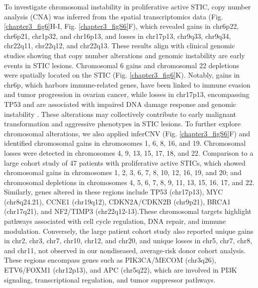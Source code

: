 \begin{refsection}
    To investigate chromosomal instability in proliferative active STIC, copy number analysis (CNA) was inferred from the spatial transcriptomics data (Fig. \ref{chapter3_fig6}H-I, Fig. \ref{chapter3_figS6}F), which revealed gains in chr6p22, chr6p21, chr1p32, and chr16p13, and losses in chr17p13, chr9q33, chr9q34, chr22q11, chr22q12, and chr22q13. These results align with clinical genomic studies showing that copy number alterations and genomic instability are early events in STIC lesions\cite{Wu2019Genomic,Chang2025Integrated,Devlin1996High,Zhakula2024Patterns}. Chromosomal 6 gains and chromosomal 22 depletions were spatially located on the STIC (Fig. \ref{chapter3_fig6}K). Notably, gains in chr6p, which harbors immune-related genes, have been linked to immune evasion and tumor progression in ovarian cancer, while losses in chr17p13, encompassing TP53 and are associated with impaired DNA damage response and genomic instability \cite{Zhakula2024Patterns}. These alterations may collectively contribute to early malignant transformation and aggressive phenotypes in STIC lesions. 
    To further explore chromosomal alterations, we also applied inferCNV (Fig. \ref{chapter3_figS6}F) and identified chromosomal gains in chromosomes 1, 6, 8, 16, and 19. Chromosomal losses were detected in chromosomes 4, 9, 13, 15, 17, 18, and 22.  Comparison to a large cohort study of 47 patients with proliferative active STICs\cite{Chang2025Integrated}, which showed chromosomal gains in chromosomes 1, 2, 3, 6, 7, 8, 10, 12, 16, 19, and 20; and chromosomal depletions in chromosomes 4, 5, 6, 7, 8, 9, 11, 13, 15, 16, 17, and 22. Similarly, genes altered in these regions include TP53 (chr17p13), MYC (chr8q24.21), CCNE1 (chr19q12), CDKN2A/CDKN2B (chr9p21), BRCA1 (chr17q21), and NF2/TIMP3 (chr22q12-13).These chromosomal targets highlight pathways associated with cell cycle regulation, DNA repair, and immune modulation. Conversely, the large patient cohort study also reported unique gains in chr2, chr3, chr7, chr10, chr12, and chr20, and unique losses in chr5, chr7, chr8, and chr11, not observed in our nondiseased, average-risk donor cohort analysis. These regions encompass genes such as PIK3CA/MECOM (chr3q26), ETV6/FOXM1 (chr12p13), and APC (chr5q22), which are involved in PI3K signaling, transcriptional regulation, and tumor suppressor pathways. 


\end{refsection}
